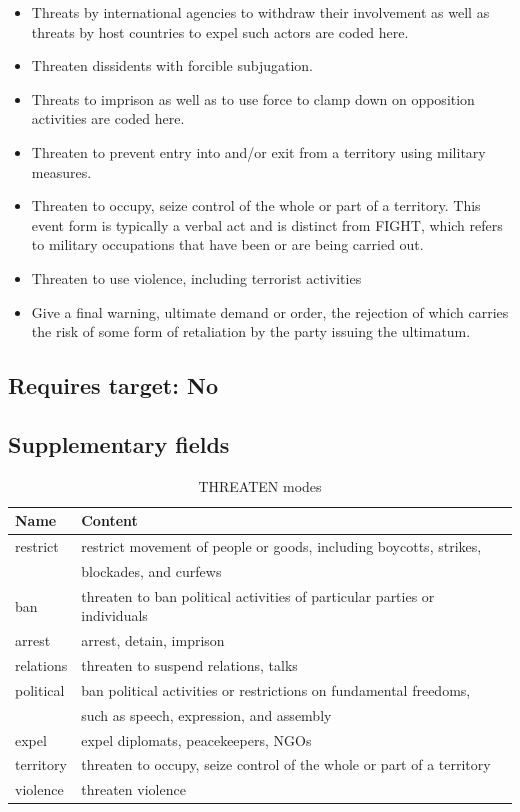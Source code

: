\documentclass[11pt]{report}
\newcommand{\plcat}[1]{\textsf{#1}}
\begin{document}
\begin{itemize}
\item Threats by international agencies to withdraw their involvement as well as threats by host countries to expel such actors are coded here. 
\item Threaten dissidents with forcible subjugation.
\item Threats to imprison as well as to use force to clamp down on opposition activities are coded here. 
\item Threaten to prevent entry into and/or exit from a territory using military measures.
\item Threaten to occupy, seize control of the whole or part of a territory.  This event form is typically a verbal act and is distinct from \plcat{FIGHT}, which refers to military occupations that have been or are being carried out.
\item Threaten to use violence, including terrorist activities

\item Give a final warning, ultimate demand or order, the rejection of which carries the risk of some form of retaliation by the party issuing the ultimatum. 
\end{itemize}

\subsection{Requires target: No}

\subsection{Supplementary fields}

\begin{table}[htp]
\caption{THREATEN modes}
\begin{center}
\begin{tabular}{|l|l|}
\hline
Name & Content \\
\hline
restrict & restrict movement of people or goods, including boycotts, strikes,  \\
& blockades, and curfews \\
ban & threaten to ban political activities of particular parties or individuals \\
arrest & arrest, detain, imprison \\
relations & threaten to suspend relations, talks \\
political & ban political activities or restrictions on fundamental freedoms, \\
& such as speech, expression, and assembly\\
expel & expel diplomats, peacekeepers, NGOs \\
territory & threaten to occupy, seize control of the whole or part of a territory \\
violence & threaten violence \\

\hline
\end{tabular}
\end{center}
\label{tab:threatmode}
\end{table}%
\end{document}
